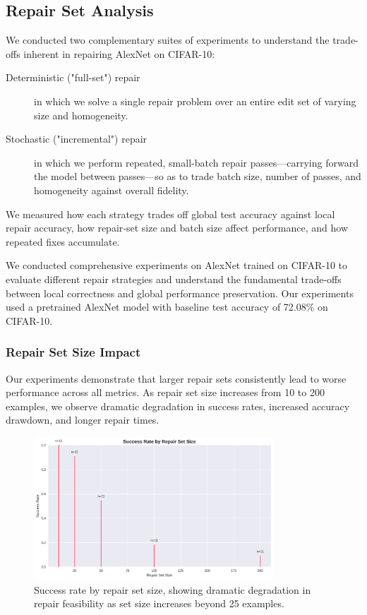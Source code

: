 \documentclass{article}
\begin{document}
\subsection{Repair Set Analysis}
We conducted two complementary suites of experiments to understand the trade-offs inherent in repairing AlexNet on CIFAR-10:

\begin{description}
	\item[Deterministic ("full-set") repair]in which we solve a single repair problem over an entire edit set of varying size and homogeneity.
	\item[Stochastic ("incremental") repair]in which we perform repeated, small-batch repair passes—carrying forward the model between passes—so as to trade batch size, number of passes, and homogeneity against overall fidelity.
\end{description}

We measured how each strategy trades off global test accuracy against local repair accuracy, how repair‐set size and batch size affect performance, and how repeated fixes accumulate.

We conducted comprehensive experiments on AlexNet trained on CIFAR-10 to evaluate different repair strategies and understand the fundamental trade-offs between local correctness and global performance preservation. Our experiments used a pretrained AlexNet model with baseline test accuracy of 72.08\% on CIFAR-10.

\subsubsection{Repair Set Size Impact}

Our experiments demonstrate that larger repair sets consistently lead to worse performance across all metrics. As repair set size increases from 10 to 200 examples, we observe dramatic degradation in success rates, increased accuracy drawdown, and longer repair times.

\begin{figure}[h]
	\centering
	\includegraphics[width=0.8\textwidth]{results/one_shot_analysis/success_rates/success_rate_by_size.png}
	\caption{Success rate by repair set size, showing dramatic degradation in repair feasibility as set size increases beyond 25 examples.}
	\label{fig:success_rate_by_size}
\end{figure}
\end{document}
